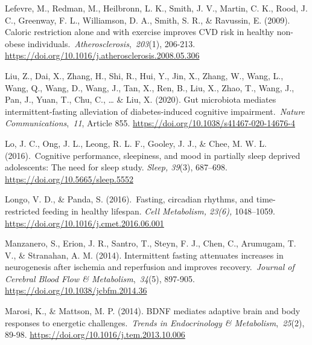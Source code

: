 \documentclass[authordate, empirical,issue]{jote-new-article}
\begin{document}
Lefevre, M., Redman, M., Heilbronn, L. K., Smith, J. V., Martin, C. K., Rood, J. C., Greenway, F. L., Williamson, D. A., Smith, S. R., \& Ravussin, E. (2009). Caloric restriction alone and with exercise improves CVD risk in healthy non-obese individuals. \emph{Atherosclerosis}, \emph{203}(1), 206-213. \url{https://doi.org/10.1016/j.atherosclerosis.2008.05.306}



Liu, Z., Dai, X., Zhang, H., Shi, R., Hui, Y., Jin, X., Zhang, W., Wang, L., Wang, Q., Wang, D., Wang, J., Tan, X., Ren, B., Liu, X., Zhao, T., Wang, J., Pan, J., Yuan, T., Chu, C., … \& Liu, X. (2020). Gut microbiota mediates intermittent-fasting alleviation of diabetes-induced cognitive impairment. \emph{Nature Communications}, \emph{11}, Article 855. \url{https://doi.org/10.1038/s41467-020-14676-4}



Lo, J. C., Ong, J. L., Leong, R. L. F., Gooley, J. J., \& Chee, M. W. L. (2016). Cognitive performance, sleepiness, and mood in partially sleep deprived adolescents: The need for sleep study.\emph{ Sleep, 39}(3), 687--698. \url{https://doi.org/10.5665/sleep.5552}






Longo, V. D., \& Panda, S. (2016). Fasting, circadian rhythms, and time-restricted feeding in healthy lifespan.\emph{ Cell Metabolism, 23(6), }1048--1059. \url{https://doi.org/10.1016/j.cmet.2016.06.001}



Manzanero, S., Erion, J. R., Santro, T., Steyn, F. J., Chen, C., Arumugam, T. V., \& Stranahan, A. M. (2014). Intermittent fasting attenuates increases in neurogenesis after ischemia and reperfusion and improves recovery. \emph{Journal of Cerebral Blood Flow \& Metabolism}, \emph{34}(5), 897-905. \url{https://doi.org/10.1038/jcbfm.2014.36}



Marosi, K., \& Mattson, M. P. (2014). BDNF mediates adaptive brain and body responses to energetic challenges. \emph{Trends in Endocrinology \& Metabolism}, \emph{25}(2), 89-98. \url{https://doi.org/10.1016/j.tem.2013.10.006}



\end{document}
